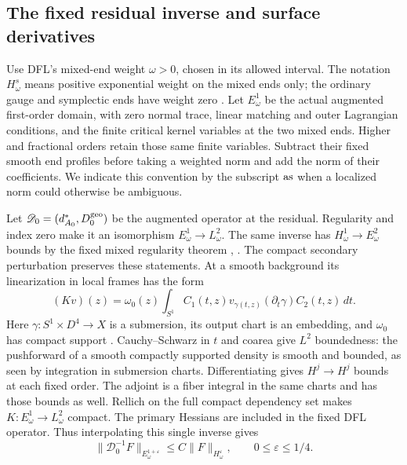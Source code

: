 \documentclass[11pt]{amsart}
\theoremstyle{definition}
\theoremstyle{remark}
\theoremstyle{plain}
\begin{document}
\subsection{The fixed residual inverse and surface derivatives}

Use DFL's mixed-end weight $\omega>0$, chosen in its allowed interval.
The notation $H^s_\omega$ means positive exponential weight on the
mixed ends only; the ordinary gauge and symplectic ends have weight
zero \cite[Definition~3.8]{DaeFukLip21a}. Let $E^1_\omega$ be the
actual augmented first-order domain, with zero normal trace, linear
matching and outer Lagrangian conditions, and the finite critical
kernel variables at the two mixed ends. Higher and fractional orders
retain those same finite variables. Subtract their fixed smooth end
profiles before taking a weighted norm and add the norm of their
coefficients. We indicate this convention by the subscript ${\rm as}$
when a localized norm could otherwise be ambiguous.

Let $\mathscr D_0=(d_{A_0}^*,D_0^{\rm geo})$ be the augmented
operator at the residual. Regularity and index zero make it an
isomorphism $E^1_\omega\to L^2_\omega$. The same inverse has
$H^1_\omega\to E^2_\omega$ bounds by the fixed mixed regularity
theorem \cite[Theorem~4.12]{DaeFukLip21a},
\cite[Theorem~5.9]{DaeFukLip21b}. The compact secondary perturbation
preserves these statements. At a smooth background its linearization
in local frames has the form
\begin{equation}\label{eq:residual-holonomy-linear}
 (Kv)(z)=\omega_0(z)\int_{S^1}C_1(t,z)
              v_{\gamma(t,z)}(\partial_t\gamma)C_2(t,z)\,dt.
\end{equation}
Here $\gamma:S^1\times D^4\to X$ is a submersion, its output
chart is an embedding, and $\omega_0$ has compact support
\cite[Section~6.2, equation~(6.13)]{DaeFukLip21a}. Cauchy--Schwarz
in $t$ and coarea give $L^2$ boundedness: the pushforward of a
smooth compactly supported density is smooth and bounded, as seen by
integration in submersion charts. Differentiating gives $H^j\to H^j$
bounds at each fixed order. The adjoint is a fiber integral in the
same charts and has those bounds as well. Rellich on the full compact
dependency set makes $K:E^1_\omega\to L^2_\omega$ compact.
The primary Hessians are included in the fixed DFL operator. Thus
interpolating this single inverse gives
\begin{equation}\label{eq:residual-fractional-baseline}
 \|\mathscr D_0^{-1}F\|_{E^{1+\varepsilon}_\omega}
                  \leq C\|F\|_{H^\varepsilon_\omega},
                        \qquad 0\leq\varepsilon\leq1/4.
\end{equation}
\end{document}
